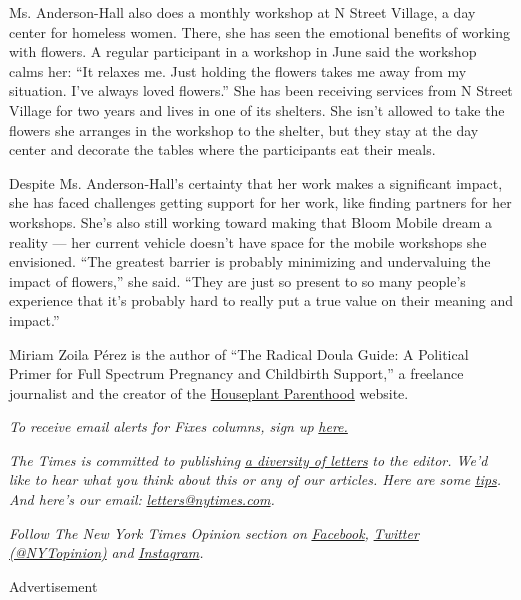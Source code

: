 Ms. Anderson-Hall also does a monthly workshop at N Street Village, a
day center for homeless women. There, she has seen the emotional
benefits of working with flowers. A regular participant in a workshop in
June said the workshop calms her: ``It relaxes me. Just holding the
flowers takes me away from my situation. I've always loved flowers.''
She has been receiving services from N Street Village for two years and
lives in one of its shelters. She isn't allowed to take the flowers she
arranges in the workshop to the shelter, but they stay at the day center
and decorate the tables where the participants eat their meals.

Despite Ms. Anderson-Hall's certainty that her work makes a significant
impact, she has faced challenges getting support for her work, like
finding partners for her workshops. She's also still working toward
making that Bloom Mobile dream a reality --- her current vehicle doesn't
have space for the mobile workshops she envisioned. ``The greatest
barrier is probably minimizing and undervaluing the impact of flowers,''
she said. ``They are just so present to so many people's experience that
it's probably hard to really put a true value on their meaning and
impact.''

Miriam Zoila Pérez is the author of ``The Radical Doula Guide: A
Political Primer for Full Spectrum Pregnancy and Childbirth Support,'' a
freelance journalist and the creator of the
\href{https://houseplantparenthood.com/}{Houseplant Parenthood} website.

\emph{To receive email alerts for Fixes columns, sign up}
\href{http://eepurl.com/ABIxL}{\emph{here.}}

\emph{The Times is committed to publishing}
\href{https://www.nytimes.com/2019/01/31/opinion/letters/letters-to-editor-new-york-times-women.html}{\emph{a
diversity of letters}} \emph{to the editor. We'd like to hear what you
think about this or any of our articles. Here are some}
\href{https://help.nytimes.com/hc/en-us/articles/115014925288-How-to-submit-a-letter-to-the-editor}{\emph{tips}}\emph{.
And here's our email:}
\href{mailto:letters@nytimes.com}{\emph{letters@nytimes.com}}\emph{.}

\emph{Follow The New York Times Opinion section on}
\href{https://www.facebook.com/nytopinion}{\emph{Facebook}}\emph{,}
\href{http://twitter.com/NYTOpinion}{\emph{Twitter (@NYTopinion)}}
\emph{and}
\href{https://www.instagram.com/nytopinion/}{\emph{Instagram}}\emph{.}

Advertisement

